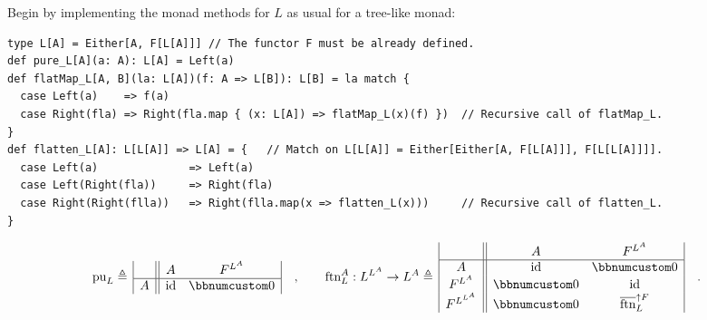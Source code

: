 Begin by implementing the monad methods for $L$ as usual for a tree-like
monad:
\begin{lstlisting}
type L[A] = Either[A, F[L[A]]] // The functor F must be already defined.
def pure_L[A](a: A): L[A] = Left(a)
def flatMap_L[A, B](la: L[A])(f: A => L[B]): L[B] = la match {
  case Left(a)    => f(a)
  case Right(fla) => Right(fla.map { (x: L[A]) => flatMap_L(x)(f) })  // Recursive call of flatMap_L. 
}
def flatten_L[A]: L[L[A]] => L[A] = {   // Match on L[L[A]] = Either[Either[A, F[L[A]]], F[L[L[A]]]].
  case Left(a)              => Left(a)
  case Left(Right(fla))     => Right(fla)
  case Right(Right(flla))   => Right(flla.map(x => flatten_L(x)))     // Recursive call of flatten_L.
}
\end{lstlisting}
\[
\text{pu}_{L}\triangleq\,\begin{array}{|c||cc|}
 & A & F^{L^{A}}\\
\hline A & \text{id} & \bbnum 0
\end{array}\quad,\quad\quad\text{ftn}_{L}^{A}:L^{L^{A}}\rightarrow L^{A}\triangleq\,\begin{array}{|c||cc|}
 & A & F^{L^{A}}\\
\hline A & \text{id} & \bbnum 0\\
F^{L^{A}} & \bbnum 0 & \text{id}\\
F^{L^{L^{A}}} & \bbnum 0 & \overline{\text{ftn}}_{L}^{\uparrow F}
\end{array}\quad.
\]

